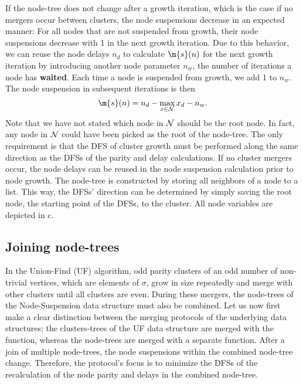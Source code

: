 If the node-tree does not change after a growth iteration, which is the case if no mergers occur between clusters, the node suspensions decrease in an expected manner: For all nodes that are not suspended from growth, their node suspensions decrease with 1 in the next growth iteration. Due to this behavior, we can reuse the node delays $n_d$ to calculate $\m{s}(n)$ for the next growth iteration by introducing another node parameter $n_w$, the number of iterations a node has \textbf{waited}. Each time a node is suspended from growth, we add 1 to $n_w$. The node suspension in subsequent iterations is then
\begin{equation}\label{eq:suspension}
    \m{s}(n) = n_d - \max_{x \in \nset}{x_d} - n_w. 
\end{equation}
Note that we have not stated which node in $\mathcal{N}$ should be the root node. In fact, any node in $\mathcal{N}$ could have been picked as the root of the node-tree. The only requirement is that the DFS of cluster growth must be performed along the same direction as the DFSs of the parity and delay calculations. If no cluster mergers occur, the node delays can be reused in the node suspension calculation prior to node growth. The node-tree is constructed by storing all neighbors of a node to a list. This way, the DFSs' direction can be determined by simply saving the root node, the starting point of the DFSs, to the cluster. All node variables are depicted in c. 


\subsection{Joining node-trees}\label{sec:nodejoin}

In the Union-Find (UF) algorithm, odd parity clusters of an odd number of non-trivial vertices, which are elements of $\sigma$, grow in size repeatedly and merge with other clusters until all clusters are even. During these mergers, the node-trees of the Node-Suspension data structure must also be combined. Let us now first make a clear distinction between the merging protocols of the underlying data structures; the clusters-trees of the UF data structure are merged with the  function, whereas the node-trees are merged with a separate  function. After a join of multiple node-trees, the node suspensions within the combined node-tree change. Therefore, the  protocol's focus is to minimize the DFSs of the recalculation of the node parity and delays in the combined node-tree. 

